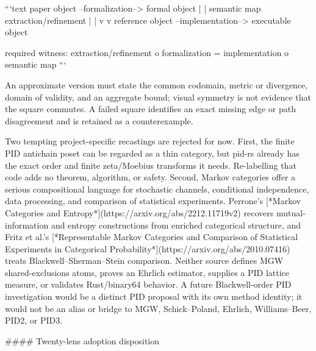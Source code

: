 \documentclass[11pt]{article}
\begin{document}
\begin{markdown}
```text
paper object  --formalization-->  formal object
     |                                  |
  semantic map                     extraction/refinement
     |                                  |
     v                                  v
reference object --implementation--> executable object

required witness: extraction/refinement o formalization
                  = implementation o semantic map
```

An approximate version must state the common codomain, metric or divergence, domain of validity,
and an aggregate bound; visual symmetry is not evidence that the square commutes. A failed square
identifies an exact missing edge or path disagreement and is retained as a counterexample.

Two tempting project-specific recastings are rejected for now. First, the finite PID antichain
poset can be regarded as a thin category, but pid-rs already has the exact order and finite
zeta/Moebius transforms it needs. Re-labelling that code adds no theorem, algorithm, or safety.
Second, Markov categories offer a serious compositional language for stochastic channels,
conditional independence, data processing, and comparison of statistical experiments. Perrone's
[*Markov Categories and Entropy*](https://arxiv.org/abs/2212.11719v2) recovers mutual-information
and entropy constructions from enriched categorical structure, and Fritz et al.'s
[*Representable Markov Categories and Comparison of Statistical Experiments in Categorical
Probability*](https://arxiv.org/abs/2010.07416) treats Blackwell--Sherman--Stein comparison. Neither
source defines MGW shared-exclusions atoms, proves an Ehrlich estimator, supplies a PID lattice
measure, or validates Rust/binary64 behavior. A future Blackwell-order PID investigation would be a
distinct PID proposal with its own method identity; it would not be an alias or bridge to MGW,
Schick--Poland, Ehrlich, Williams--Beer, PID2, or PID3.

#### Twenty-lens adoption disposition


\end{markdown}
\end{document}

